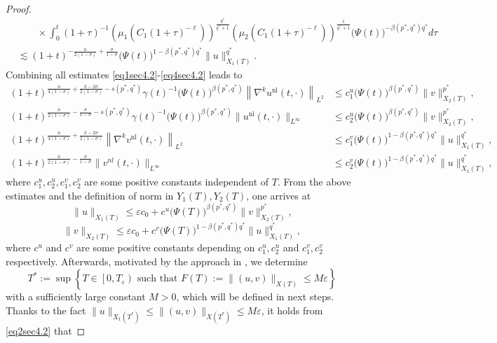 \documentclass[11pt,reqno]{amsart}
\numberwithin{equation}{section}
\theoremstyle{plain}
\begin{document}
\begin{proof}
\begin{align}
    &\qquad \times \int_0^t(1+\tau)^{-1}\left(\mu_1\left(C_1(1+\tau)^{-\ell}\right)\right)^{\frac{q^*}{q^*+1}}\left(\mu_2\left(C_1(1+\tau)^{-\ell}\right)\right)^{\frac{1}{q^*+1}}\big(\Psi(t)\big)^{-\beta(p^*,q^*)q^*}d\tau\nonumber \\
    &\lesssim (1+t)^{-\frac{n}{2(1-\sigma)}+\frac{\sigma}{1-\sigma}}\big(\Psi(t)\big)^{1-\beta(p^*,q^*)q^*}\|u\|_{X_1(T)}^{q^*}. \label{eq4sec4.2}
\end{align}
Combining all estimates \eqref{eq1sec4.2}-\eqref{eq4sec4.2} leads to
\[
\begin{aligned}
(1+t)^{\frac{n}{4(1-\sigma)}+\frac{k-2\sigma}{2(1-\sigma)}-s(p^*,q^*)}\gamma(t)^{-1}\big(\Psi(t)\big)^{\beta(p^*,q^*)}\left\|\nabla^ku^{\mathrm{nl}}(t, \cdot)\right\|_{L^2}&\leq c^u_1\big(\Psi(t)\big)^{\beta(p^*,q^*)}\|v\|_{X_2(T)}^{p^*},\\
(1+t)^{\frac{n}{2(1-\sigma)}-\frac{\sigma}{1-\sigma}-s(p^*,q^*)}\gamma(t)^{-1}\big(\Psi(t)\big)^{\beta(p^*,q^*)}\|u^{\mathrm{nl}}(t,\cdot)\|_{L^{\infty}}&\leq c^{u}_2\big(\Psi(t)\big)^{\beta(p^*,q^*)}\|v\|^{p^*}_{X_2(T)},\\
(1+t)^{\frac{n}{4(1-\sigma)}+\frac{k-2\sigma}{2(1-\sigma)}}\left\|\nabla^kv^{\mathrm{nl}}(t, \cdot)\right\|_{L^2}&\leq c^v_1\big(\Psi(t)\big)^{1-\beta(p^*,q^*)q^*}\|u\|_{X_1(T)}^{q^*},\\
(1+t)^{\frac{n}{2(1-\sigma)}-\frac{\sigma}{1-\sigma}}\|v^{nl}(t,\cdot)\|_{L^{\infty}}&\leq c^{v}_2\big(\Psi(t)\big)^{1-\beta(p^*,q^*)q^*}\|u\|^{q^*}_{X_1(T)},
\end{aligned}
\]
where $c^u_1,c^u_2,c^v_1,c^v_2$ are some positive constants independent of $T$. From the above estimates and the definition of norm in $Y_1(T),Y_2(T)$, one arrives at
\begin{equation}\label{eq5sec4.2}
    \|u\|_{X_1(T)}\leq \varepsilon c_0+c^u\big(\Psi(T)\big)^{\beta(p^*,q^*)}\|v\|_{X_2(T)}^{p^*},
\end{equation}    
\begin{equation}\label{eq6sec4.2}
    \|v\|_{X_2(T)}\leq \varepsilon c_0+c^v\big(\Psi(T)\big)^{1-\beta(p^*,q^*)q^*}\|u\|_{X_1(T)}^{q^*},
\end{equation}
where $c^u$ and $c^v$ are some positive constants depending on $c_1^u,c_2^u$ and $c_1^v,c_2^v$ respectively. Afterwards, motivated by the approach in \cite{IkeOga2016}, we determine
$$ T^*:=\sup \left\{T \in\left[0, T_{\varepsilon}\right) \text { such that } F(T):=\|(u, v)\|_{X(T)} \leq M \varepsilon\right\} $$
with a sufficiently large constant $M>0$, which will be defined in next steps. Thanks to the fact $\|u\|_{X_1\left(T^*\right)} \leq\|(u, v)\|_{X\left(T^*\right)} \leq M \varepsilon$, it holds from \eqref{eq2sec4.2} that

\end{proof}
\end{document}
